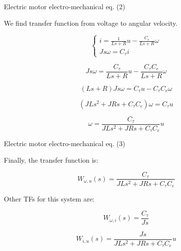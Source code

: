 \documentclass{beamer}
\begin{document}
\begin{frame}{Electric motor electro-mechanical eq. (2)}
\begin{flushleft}

We find transfer function from voltage to angular velocity.

\begin{equation}
    \begin{cases}
    i = \frac{1}{L s + R} u - \frac{C_e}{L s + R} \omega\\
    J s \omega = C_\tau i
    \end{cases}
\end{equation}

\begin{equation}
    J s \omega = \frac{C_\tau}{L s + R} u - \frac{C_\tau C_e}{L s + R} \omega
\end{equation}

\begin{equation}
    (L s + R) J s \omega = C_\tau u - C_\tau C_e \omega
\end{equation}

\begin{equation}
    (J L s^2 + J R s + C_\tau C_e)  \omega = C_\tau u
\end{equation}

\begin{equation}
    \omega = \frac{C_\tau}{J L s^2 + J R s + C_\tau C_e} u
\end{equation}

\end{flushleft}
\end{frame}



\begin{frame}{Electric motor electro-mechanical eq. (3)}
\begin{flushleft}

Finally, the transfer function is:

\begin{equation}
    W_{\omega, u}(s) = \frac{C_\tau}{J L s^2 + J R s + C_\tau C_e}
\end{equation}

Other TFs for this system are:

\begin{equation}
    W_{\omega, i}(s) = \frac{C_\tau }{J s}
\end{equation}

\begin{equation}
    W_{i, u}(s) = 
    \frac{J s}{J L s^2 + J R s + C_\tau C_e} u
\end{equation}


\end{flushleft}
\end{frame}
\end{document}
